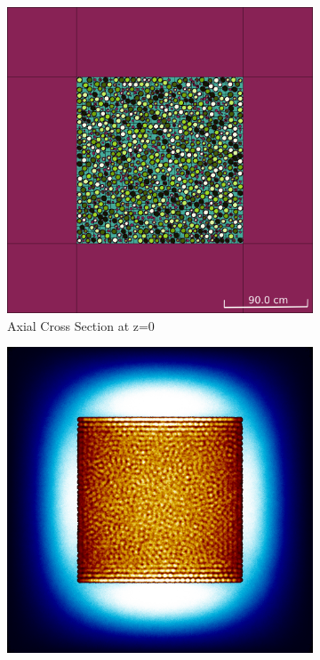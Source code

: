 \begin{figure}[H]
\begin{subfigure}{0.45\textwidth}
  \includegraphics[width=0.95\linewidth]{figures/control/control-v}
  \caption{Axial Cross Section at z=0 }
  \label{fig:controlc}
\end{subfigure}
%
\begin{subfigure}{0.45\textwidth}
  \includegraphics[width=0.95\linewidth]{figures/control/control-vm}

\end{subfigure}
\end{figure}
